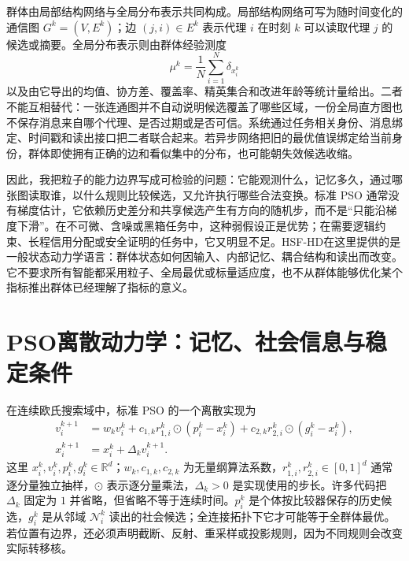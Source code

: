群体由局部结构网络与全局分布表示共同构成。局部结构网络可写为随时间变化的通信图 $G^k=(V,E^k)$；边 $(j,i)\in E^k$ 表示代理 $i$ 在时刻 $k$ 可以读取代理 $j$ 的候选或摘要。全局分布表示则由群体经验测度
\[
\mu^k=\frac{1}{N}\sum_{i=1}^{N}\delta_{x_i^k}
\]
以及由它导出的均值、协方差、覆盖率、精英集合和改进年龄等统计量给出。二者不能互相替代：一张连通图并不自动说明候选覆盖了哪些区域，一份全局直方图也不保存消息来自哪个代理、是否过期或是否可信。系统通过任务相关身份、消息绑定、时间戳和读出接口把二者联合起来。若异步网络把旧的最优值误绑定给当前身份，群体即使拥有正确的边和看似集中的分布，也可能朝失效候选收缩。

因此，我把粒子的能力边界写成可检验的问题：它能观测什么，记忆多久，通过哪张图读取谁，以什么规则比较候选，又允许执行哪些合法变换。标准 PSO 通常没有梯度估计，它依赖历史差分和共享候选产生有方向的随机步，而不是“只能沿梯度下滑”。在不可微、含噪或黑箱任务中，这种弱假设正是优势；在需要逻辑约束、长程信用分配或安全证明的任务中，它又明显不足。HSF-HD在这里提供的是一般状态动力学语言：群体状态如何因输入、内部记忆、耦合结构和读出而改变。它不要求所有智能都采用粒子、全局最优或标量适应度，也不从群体能够优化某个指标推出群体已经理解了指标的意义。

\section{PSO离散动力学：记忆、社会信息与稳定条件}
\label{sec:section_3742}

在连续欧氏搜索域中，标准 PSO 的一个离散实现为
\begin{align}
v_i^{k+1} &= w_k v_i^k+c_{1,k}r_{1,i}^k\odot(p_i^k-x_i^k)
             +c_{2,k}r_{2,i}^k\odot(g_i^k-x_i^k),\\
x_i^{k+1} &= x_i^k+\Delta_k v_i^{k+1}.
\end{align}
这里 $x_i^k,v_i^k,p_i^k,g_i^k\in\mathbb{R}^{d}$；$w_k,c_{1,k},c_{2,k}$ 为无量纲算法系数，$r_{1,i}^k,r_{2,i}^k\in[0,1]^d$ 通常逐分量独立抽样，$\odot$ 表示逐分量乘法，$\Delta_k>0$ 是实现使用的步长。许多代码把 $\Delta_k$ 固定为 $1$ 并省略，但省略不等于连续时间。$p_i^k$ 是个体按比较器保存的历史候选，$g_i^k$ 是从邻域 $\mathcal{N}_i^k$ 读出的社会候选；全连接拓扑下它才可能等于全群体最优。若位置有边界，还必须声明截断、反射、重采样或投影规则，因为不同规则会改变实际转移核。

